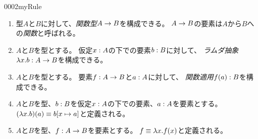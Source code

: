 \documentclass[index]{subfiles}
\begin{document}
\begin{myBlock}{0002}{myRule}
  \begin{enumerate}
  \item 型\(A\)と\(B\)に対して、\emph{関数型}\(A \to B\)を構成できる。
    \(A \to B\)の要素は\(A\)から\(B\)への\emph{関数}と呼ばれる。
  \item \(A\)と\(B\)を型とする。
    仮定\(x : A\)の下での要素\(b : B\)に対して、
    \emph{ラムダ抽象}\(\lambda x . b : A \to B\)を構成できる。
  \item \(A\)と\(B\)を型とする。
    要素\(f : A \to B\)と\(a : A\)に対して、
    \emph{関数適用}\(f(a) : B\)を構成できる。
  \item \(A\)と\(B\)を型、\(b : B\)を仮定\(x : A\)の下での要素、\(a : A\)を要素とする。
    \((\lambda x . b)(a) \equiv b[x \mapsto a]\)と定義される。
  \item \(A\)と\(B\)を型、\(f : A \to B\)を要素とする。
    \(f \equiv \lambda x . f(x)\)と定義される。
  \end{enumerate}
\end{myBlock}
\end{document}
